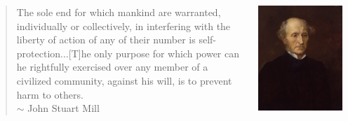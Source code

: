 \documentclass[aspectratio=169]{beamer}
\theoremstyle{principle}
\begin{document}
\begin{frame}
\begin{columns}
\begin{column}{0.5\textwidth}
\begin{quote}
The sole end for which mankind are warranted, individually or collectively, in interfering with the liberty of action of any of their number is self-protection...[T]he only purpose for which power can he rightfully exercised over any member of a civilized community, against his will, is to prevent harm to others.\\
\hspace{25mm}$\sim$ John Stuart Mill
\end{quote}
\end{column}
\begin{column}{0.5\textwidth}
\includegraphics[scale=0.25]{JSM.jpg}
\end{column}
\end{columns}
\end{frame}
\end{document}
